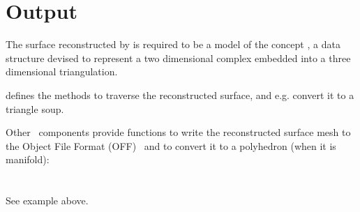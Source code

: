 \section{Output}

The surface reconstructed by  is required to be a model of the concept , a data structure devised to represent a two dimensional complex embedded into a three dimensional triangulation.

 defines the methods to traverse the reconstructed surface, and e.g. convert it to a triangle soup.

Other \cgal\ components provide functions to write the reconstructed surface mesh to the Object File Format (OFF)~\cite{cgal:p-gmgv16-96} and to convert it to a polyhedron (when it is manifold): \\
  \\
  \\

See  example above.